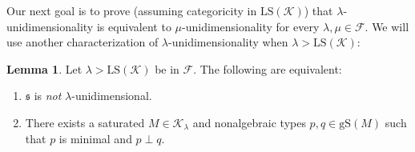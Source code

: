 \documentclass[12pt]{amsart}
\theoremstyle{definition}
\newtheorem{lem}[mydef]{Lemma}
\begin{document}
Our next goal is to prove (assuming categoricity in ${\text{LS}} ({\mathcal{K}})$) that $\lambda$-unidimensionality is equivalent to $\mu$-unidimensionality for every $\lambda, \mu \in {\mathcal{F}}$. We will use another characterization of $\lambda$-unidimensionality when $\lambda > {\text{LS}} ({\mathcal{K}})$:

\begin{lem}\label{min-unidim}
  Let $\lambda > {\text{LS}} ({\mathcal{K}})$ be in ${\mathcal{F}}$. The following are equivalent:
  
  \begin{enumerate}
    \item\label{min-unidim-1} ${\mathfrak{s}}$ is \emph{not} $\lambda$-unidimensional.
    \item\label{min-unidim-2} There exists a saturated $M \in {\mathcal{K}}_\lambda$ and nonalgebraic types $p, q \in {\text{gS}} (M)$ such that $p$ is minimal and $p \perp q$.
  \end{enumerate}
\end{lem}
\end{document}

